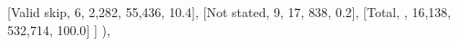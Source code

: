 \documentclass[
  11pt,
  a4paper,
]{article}
\newenvironment{Shaded}{\begin{snugshade}}{\end{snugshade}}
\newcommand{\NormalTok}[1]{\textcolor[rgb]{0.00,0.23,0.31}{#1}}
\newcommand{\StringTok}[1]{\textcolor[rgb]{0.13,0.47,0.30}{#1}}
\begin{document}
\begin{Shaded}
\begin{Highlighting}[]
\NormalTok{                    [}\StringTok{\textquotesingle{}Valid skip\textquotesingle{}}\NormalTok{, }\StringTok{\textquotesingle{}6\textquotesingle{}}\NormalTok{, }\StringTok{\textquotesingle{}2,282\textquotesingle{}}\NormalTok{, }\StringTok{\textquotesingle{}55,436\textquotesingle{}}\NormalTok{, }\StringTok{\textquotesingle{}10.4\textquotesingle{}}\NormalTok{],}
\NormalTok{                    [}\StringTok{\textquotesingle{}Not stated\textquotesingle{}}\NormalTok{, }\StringTok{\textquotesingle{}9\textquotesingle{}}\NormalTok{, }\StringTok{\textquotesingle{}17\textquotesingle{}}\NormalTok{, }\StringTok{\textquotesingle{}838\textquotesingle{}}\NormalTok{, }\StringTok{\textquotesingle{}0.2\textquotesingle{}}\NormalTok{],}
\NormalTok{                    [}\StringTok{\textquotesingle{}Total\textquotesingle{}}\NormalTok{, }\StringTok{\textquotesingle{}\textquotesingle{}}\NormalTok{, }\StringTok{\textquotesingle{}16,138\textquotesingle{}}\NormalTok{, }\StringTok{\textquotesingle{}532,714\textquotesingle{}}\NormalTok{, }\StringTok{\textquotesingle{}100.0\textquotesingle{}}\NormalTok{]}
\NormalTok{                ]}
\NormalTok{            ),}


\end{Highlighting}
\end{Shaded}
\end{document}

